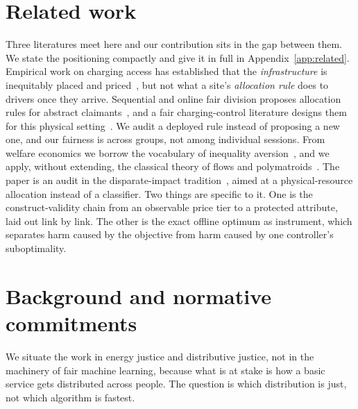 \documentclass[manuscript, screen, review, anonymous]{acmart}
\begin{document}
\section{Related work}
\label{sec:related}

Three literatures meet here and our contribution sits in the gap between them. We state the positioning compactly and give it in full in Appendix~\ref{app:related}. Empirical work on charging access has established that the \emph{infrastructure} is inequitably placed and priced~\cite{hsu2021public,khan2022inequitable,caulfield2022measuring,yu2025equity,lou2024income}, but not what a site's \emph{allocation rule} does to drivers once they arrive. Sequential and online fair division proposes allocation rules for abstract claimants~\cite{sinclair2023sequential,benade2018make}, and a fair charging-control literature designs them for this physical setting~\cite{ardakanian2013distributed,zeballos2019proportional,danner2021quality}. We audit a deployed rule instead of proposing a new one, and our fairness is across groups, not among individual sessions. From welfare economics we borrow the vocabulary of inequality aversion~\cite{atkinson1970measurement,mo2000fair,moulin2003fair}, and we apply, without extending, the classical theory of flows and polymatroids~\cite{gale1957theorem,edmonds2003submodular,megiddo1974optimal,fujishige2005submodular}. The paper is an audit in the disparate-impact tradition~\cite{feldman2015certifying,barocas2023fairness}, aimed at a physical-resource allocation instead of a classifier. Two things are specific to it. One is the construct-validity chain from an observable price tier to a protected attribute, laid out link by link. The other is the exact offline optimum as instrument, which separates harm caused by the objective from harm caused by one controller's suboptimality.

\section{Background and normative commitments}
\label{sec:background}

We situate the work in energy justice and distributive justice, not in the machinery of fair machine learning, because what is at stake is how a basic service gets distributed across people. The question is which distribution is just, not which algorithm is fastest.
\end{document}
